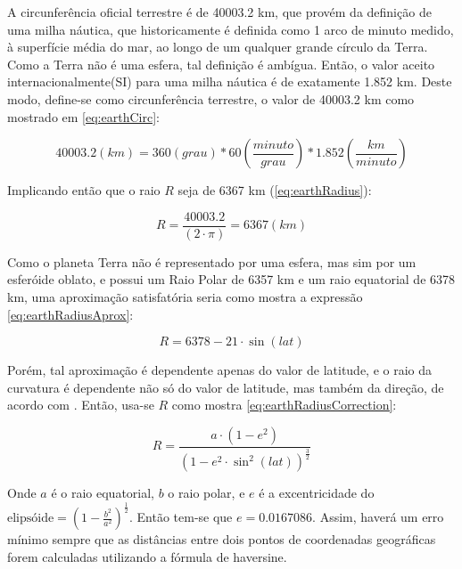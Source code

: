 A circunferência oficial terrestre é de 40003.2 km, que provém da definição de uma milha náutica, que historicamente é definida como 1 arco de minuto medido, à superfície média do mar, ao longo de um qualquer grande círculo da Terra. Como a Terra não é uma esfera, tal definição é ambígua. Então, o valor aceito internacionalmente(SI) para uma milha náutica é de exatamente 1.852 km. Deste modo, define-se como circunferência terrestre, o valor de 40003.2 km como mostrado em \ref{eq:earthCirc}:

\begin{equation}
\label{eq:earthCirc}
40003.2 (km) = 360(grau) * 60\left(\frac{minuto}{grau}\right) * 1.852\left(\frac{km}{minuto}\right)  
\end{equation}


Implicando então que o raio \(R\) seja de 6367 km (\ref{eq:earthRadius}):

\begin{equation}
\label{eq:earthRadius}
R = \frac{40003.2}{(2 \cdot \pi)} = 6367 (km)
\end{equation}

Como o planeta Terra não é representado por uma esfera, mas sim por um esferóide oblato, e possui um Raio Polar de 6357 km e um raio equatorial de 6378 km, uma aproximação satisfatória seria como mostra a expressão \ref{eq:earthRadiusAprox}:

\begin{equation}
\label{eq:earthRadiusAprox}
R = 6378 - 21 \cdot \sin(lat)
\end{equation}

Porém, tal aproximação é dependente apenas do valor de latitude, e o raio da curvatura é dependente não só do valor de latitude, mas também da direção, de acordo com \cite{snyder1987map}. Então, usa-se \(R\) como mostra \ref{eq:earthRadiusCorrection}:

\begin{equation}
\label{eq:earthRadiusCorrection}
R = \frac{ a \cdot (1 - e^2)}{ (1 - e^2 \cdot \sin^2(lat))^\frac{3}{2}}
\end{equation}

Onde \(a\) é o raio equatorial, \(b\) o raio polar, e \(e\) é a excentricidade do 
\(\text{elipsóide} = \left(1 - \frac{b^2}{a^2}\right)^\frac{1}{2}\). 
Então tem-se que \(e = 0.0167086\). Assim, haverá um erro mínimo sempre que as distâncias entre dois pontos de coordenadas geográficas forem calculadas utilizando a fórmula de haversine.


